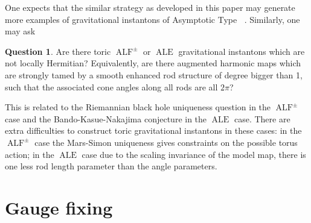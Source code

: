 \documentclass[a4paper,11pt]{amsart}
\theoremstyle{definition}
\newtheorem{question}[theorem]{Question}
\numberwithin{equation}{section}
\DeclareMathOperator{\ALF}{ALF}
\DeclareMathOperator{\ALE}{ALE}
\DeclareMathOperator{\AFa}{AF_\beta}
\begin{document}
One expects that the similar strategy as developed in this paper may generate more examples of gravitational instantons of Asymptotic Type $\AFa$. Similarly, one may ask

\begin{question}
    Are there toric $\ALF^\pm$ or $\ALE$ gravitational instantons which are not locally Hermitian? Equivalently, are there augmented harmonic maps which are strongly tamed by a smooth enhanced rod structure of degree bigger than 1, such that the associated cone angles along all rods are all $2\pi$?
\end{question}

 This is related to the Riemannian black hole uniqueness question in the $\ALF^\pm$ case  and the Bando-Kasue-Nakajima conjecture \cite{BKN} in the $\ALE$ case. There are extra difficulties to construct toric gravitational instantons in these cases: in the $\ALF^\pm$ case the Mars-Simon uniqueness \cite{MarsSimon} gives constraints on the possible torus action;  in the $\ALE$ case due to the scaling invariance of the model map, there is one less rod length parameter than the angle parameters. 

\appendix


\section{Gauge fixing}
\end{document}
